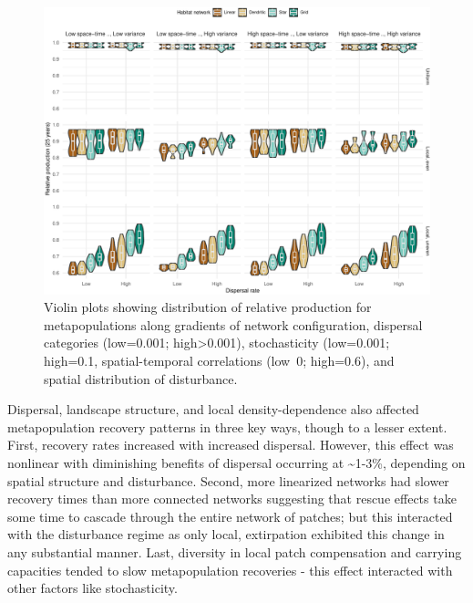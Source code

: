 \documentclass[
]{article}
\begin{document}
\begin{figure}[H]

{\centering \includegraphics{Managing_for_ecological_surprises_in_metapopulations_files/figure-latex/violin plots of risk of relative production-1} 

}

\caption{Violin plots showing distribution of relative production for metapopulations along gradients of network configuration, dispersal categories (low=0.001; high>0.001), stochasticity (low=0.001; high=0.1, spatial-temporal correlations (low~0; high=0.6), and spatial distribution of disturbance.}\label{fig:violin plots of risk of relative production}
\end{figure}

Dispersal, landscape structure, and local density-dependence also
affected metapopulation recovery patterns in three key ways, though to a
lesser extent. First, recovery rates increased with increased dispersal.
However, this effect was nonlinear with diminishing benefits of
dispersal occurring at \textasciitilde1-3\%, depending on spatial
structure and disturbance. Second, more linearized networks had slower
recovery times than more connected networks suggesting that rescue
effects take some time to cascade through the entire network of patches;
but this interacted with the disturbance regime as only local,
extirpation exhibited this change in any substantial manner. Last,
diversity in local patch compensation and carrying capacities tended to
slow metapopulation recoveries - this effect interacted with other
factors like stochasticity.
\end{document}
